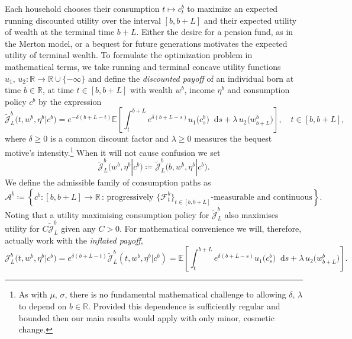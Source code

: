 \documentclass[11pt,oneside,english,reqno,dvipsnames,table]{amsart}
\numberwithin{equation}{section}
\theoremstyle{plain}
\theoremstyle{definition}
\theoremstyle{remark}
\theoremstyle{plain}
\theoremstyle{plain}
\theoremstyle{plain}
\theoremstyle{plain}
\theoremstyle{plain}
\theoremstyle{plain}
\theoremstyle{plain}
\newcommand{\EE}{\mathbb{E}}
\newcommand{\RR}{\mathbb{R}}
\newcommand{\dd}{\mathop{}\!\mathrm{d}}
\newcommand{\mcA}{\mathcal{A}}
\newcommand{\mcF}{\mathcal{F}}
\newcommand{\mcJ}{\mathcal{J}}
\newcommand{\mbR}{\mathbb{R}}
\numberwithin{thm}{section}
\begin{document}
Each household chooses their consumption $t\mapsto c^b_t$ to maximize an expected running discounted utility over the interval $[b,b + L]$ and their expected utility of wealth at the terminal time $b + L$. Either the desire for a pension fund, as in the Merton model, or a bequest for future generations motivates the expected utility of terminal wealth. To formulate the optimization problem in mathematical terms, we take running and terminal concave utility functions $u_1,\,u_2:\RR\rightarrow \RR\cup\{-\infty\}$ and define the \emph{discounted payoff} of an individual born at time $b\in \mbR$, at time $t\in [b,b+L]$ with wealth $w^b$, income $\eta^b$ and consumption policy $c^b$ by the expression
%
\begin{equation}\label{eq:olg_payoff_discounted}
   \tilde{ \mcJ}^b_{L}\big(t,w^b,\eta^b|c^b\big)=e^{-\delta (b+L-t)}\EE\left[\int_{t}^{b+L} e^{\delta(b+L- s)}u_1\big(c^b_s\big)\dd s + \lambda \, u_2\big(w^b_{b+L}\big)\right], \quad t\in [b,b+L],
\end{equation}
%
where $\delta\geq 0$ is a common discount factor and $\lambda\geq 0$
 measures the bequest motive's intensity.\footnote{As with $\mu,\,\sigma$, there is no fundamental mathematical challenge to allowing $\delta,\,\lambda$ to depend on $b\in \mbR$. Provided this dependence is sufficiently regular and bounded then our main results would apply with only minor, cosmetic change.} When it will not cause confusion we set
 \begin{equation*}
 \tilde{ \mcJ}^b_{L}\big(w^b,\eta^b|c^b\big) \coloneqq  \tilde{ \mcJ}^b_{L}\big(b,w^b,\eta^b|c^b\big).
 \end{equation*}
 We define the admissible family of consumption paths as
 \begin{equation*}
     \mcA^b \coloneqq \left\{c^b:[b,b+L]\to \mbR\,:\, \text{progressively } \{\mcF^{b}_t\}_{t\in [b,b+L]}\text{-measurable and continuous} \right\}.
 \end{equation*}
 Noting that a utility maximising consumption policy for $\tilde{ \mcJ}^b_L$ also maximises utility for $C\tilde{ \mcJ}^b_L$ given any $C>0$. For mathematical convenience we will, therefore, actually work with the \emph{inflated payoff},
 \begin{equation}\label{eq:olg_payoff_inflated}
 \mcJ^b_L\big(t,w^b,\eta^b|c^b\big)=e^{\delta(b+L-t)}\tilde{\mcJ}^b_L(t,w^b,\eta^b|c^b) =\EE\left[\int_t^{b+L} e^{\delta(b+L- s)}u_1\big(c^b_s\big)\dd s + \lambda \, u_2\big(w^b_{b+L}\big)\right]. 
 \end{equation}
%
\end{document}
